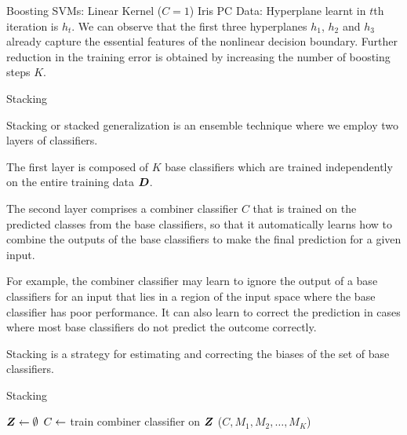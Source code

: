 {\begin{frame}[fragile]{Boosting SVMs: Linear Kernel ($C=1$)}
\small
Iris PC Data: Hyperplane learnt in $t$th iteration is $h_t$. 
We can observe that the first three hyperplanes $h_1$, $h_2$ and $h_3$
already capture the essential features of
  the nonlinear decision
  boundary.
  Further reduction in the training error is obtained by increasing the
  number of boosting steps $K$.
\end{frame}



\begin{frame}{Stacking}

Stacking or stacked generalization is an ensemble technique where we employ two
layers of classifiers. 

\medskip

The first layer is composed of $K$ base classifiers
which are trained independently on the entire training data ${\boldsymbol D}$.

\medskip

The second layer comprises a combiner classifier $C$ that is trained on the
predicted classes from the base classifiers, so that it automatically 
learns how to combine the outputs of the base classifiers to make the
final prediction for a given input. 

\medskip

For example, the combiner classifier
may learn to ignore the output of a base classifiers for an input that
lies in a region of the input space where the base classifier has poor
performance. 
It can also learn to
correct the prediction in cases where most base classifiers do not
predict the outcome correctly. 

\medskip

Stacking is a strategy
for estimating and correcting the biases of the set of base classifiers.
\end{frame}

\begin{frame}[fragile]{Stacking}

 
\newcommand{\algStacking}{\textsc{Stacking}}
\begin{tightalgo}[H]{\textwidth-18pt} 
\SetKwInOut{Algorithm}{\algStacking ($K, \bM, C, \bD$)} 
\Algorithm{} 
${\boldsymbol Z} \leftarrow \emptyset$\; 
\label{alg:class:ensemble:stacking:traincombstart} 
$C \leftarrow $ train combiner classifier on ${\boldsymbol Z}$\;
\label{alg:class:ensemble:stacking:traincombend} 
\Return($C, M_1, M_2, \ldots, M_K$)\; 
\end{tightalgo}
\end{frame}



}
